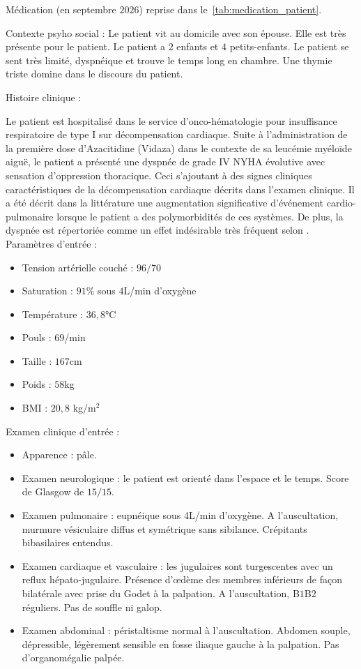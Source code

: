 Médication (en septembre $2026$) reprise dans le~\cref{tab:medication_patient}.



Contexte psyho social : 
Le patient vit au domicile avec son épouse. Elle est très présente pour le patient. Le patient a $2$ enfants et $4$ petits-enfants. 
Le patient se sent très limité, dyspnéique et trouve le temps long en chambre.  Une thymie triste domine dans le discours du patient. 

Histoire clinique :

Le patient est hospitalisé dans le service d’onco-hématologie pour insuffisance respiratoire de type I sur décompensation cardiaque. Suite à l’administration de la première dose d’Azacitidine (Vidaza) dans le contexte de sa leucémie myéloïde aiguë, le patient a présenté une dyspnée de grade IV NYHA évolutive avec sensation d’oppression thoracique. Ceci s’ajoutant à des signes cliniques caractéristiques de la décompensation cardiaque décrits dans l’examen clinique. Il a été décrit dans la littérature une augmentation significative d’événement cardio-pulmonaire lorsque le patient a des polymorbidités de ces systèmes. De plus, la dyspnée est répertoriée comme un effet indésirable très fréquent selon \textcite{ema_azacitidine_accord}.\\ 

Paramètres d’entrée :
\begin{itemize}[label=\textbullet]
    \item Tension artérielle couché : $96/70$
    \item Saturation : $91$\% sous $4$L/min d’oxygène
    \item Température : $36,8$°C
    \item Pouls : $69$/min
    \item Taille : $167$cm
    \item Poids : $58$kg
    \item BMI : $20,8$ kg/m$^2$
    \end{itemize}

Examen clinique d’entrée :
    \begin{itemize}[label=\textbullet]
    \item Apparence : pâle.
    \item Examen neurologique : le patient est orienté dans l’espace et le temps. Score de Glasgow de $15/15$.
    \item Examen pulmonaire : eupnéique sous 4L/min d’oxygène. A l’auscultation, murmure vésiculaire diffus et symétrique sans sibilance. Crépitants bibasilaires entendus.
    \item Examen cardiaque et vasculaire : les jugulaires sont turgescentes avec un reflux hépato-jugulaire. Présence d’œdème des membres inférieurs de façon bilatérale avec prise du Godet à la palpation. A l’auscultation, B$1$B$2$ réguliers. Pas de souffle ni galop.
    \item Examen abdominal : péristaltisme normal à l’auscultation. Abdomen souple, dépressible, légèrement sensible en fosse iliaque gauche à la palpation. Pas d’organomégalie palpée.
    \end{itemize}


